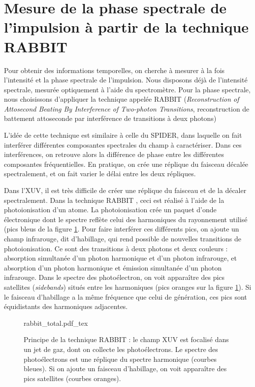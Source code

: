 \section{Mesure de la phase spectrale de l'impulsion à partir de la technique RABBIT}
\label{sec:omabbit}
Pour obtenir des informations temporelles, on cherche à mesurer à la fois l'intensité et la phase spectrale de l'impulsion. Nous disposons déjà de l'intensité spectrale, mesurée optiquement à l'aide du spectromètre. Pour la phase spectrale, nous choisissons d'appliquer la technique appelée RABBIT (\textit{Reconstruction of Attosecond Beating By
Interference of Two-photon Transitions}, reconstruction de battement attoseconde par
interférence de transitions à deux photons)

L'idée de cette technique est similaire à celle du SPIDER, dans laquelle on fait interférer différentes composantes spectrales du champ à caractériser. Dans ces interférences, on retrouve alors la différence de phase entre les différentes composantes fréquentielles. En pratique, on crée une réplique du faisceau décalée spectralement, et on fait varier le délai entre les deux répliques. \par Dans l'XUV, il est très difficile de créer une réplique du faisceau et de la décaler spectralement. Dans la technique RABBIT , ceci est réalisé à l'aide de la photoionisation d'un atome. La photoionisation crée un paquet d'onde électronique dont le spectre reflète celui des harmoniques du rayonnement utilisé (pics bleus de la figure \ref{fig:rabbit}. Pour faire interférer ces différents pics, on ajoute un champ infrarouge, dit d'habillage, qui rend possible de nouvelles transitions de photoionisation. Ce sont des transitions à deux photons et deux couleurs : absorption simultanée d'un photon harmonique et d'un photon infrarouge, et
absorption d'un photon harmonique et émission simultanée d'un photon infrarouge. Dans le spectre des photoélectron, on voit apparaître des pics satellites (\textit{sidebands}) situés entre les harmoniques (pics oranges sur la figure \ref{fig:rabbit}). Si le faisceau d'habillage a la même fréquence que celui de génération, ces pics sont équidistants des harmoniques adjacentes. 

\begin{figure}[!ht]
\centering
\def\svgwidth{1\columnwidth}
{rabbit_total.pdf_tex}
\caption{Principe de la technique RABBIT : le champ XUV est focalisé dans un jet de gaz, dont on collecte les photoélectrons. Le spectre des photoélectrons est une réplique du spectre harmonique (courbes bleues). Si on ajoute un faisceau d'habillage, on voit apparaître des pics satellites (courbes oranges).}
\label{fig:rabbit}
\end{figure}

